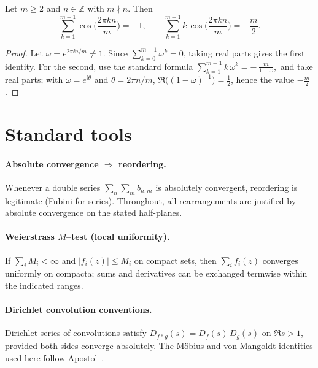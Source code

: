 \begin{lemma}\label{lem:trig-sums}
Let $m\ge2$ and $n\in\mathbb Z$ with $m\nmid n$. Then
\[
\sum_{k=1}^{m-1}\cos\!\Big(\frac{2\pi kn}{m}\Big)=-1,
\qquad
\sum_{k=1}^{m-1}k\,\cos\!\Big(\frac{2\pi kn}{m}\Big)=-\frac{m}{2}.
\]
\end{lemma}
\begin{proof}
Let $\omega=e^{2\pi \ii n/m}\neq 1$. Since $\sum_{k=0}^{m-1}\omega^k=0$, taking real parts gives the first identity. For the second, use the standard formula
\(
\sum_{k=1}^{m-1}k\,\omega^k=-\,\frac{m}{1-\omega},
\)
and take real parts; with $\omega=e^{\ii\theta}$ and $\theta=2\pi n/m$, $\Re\big((1-\omega)^{-1}\big)=\frac12$, hence the value $-\frac{m}{2}$. 
\end{proof}

\section{Standard tools}\label{app:standard-tools}

\paragraph{Absolute convergence $\Rightarrow$ reordering.}
Whenever a double series $\sum_{n}\sum_{m} b_{n,m}$ is absolutely convergent, reordering is legitimate (Fubini for series). Throughout, all rearrangements are justified by absolute convergence on the stated half-planes.

\paragraph{Weierstrass $M$–test (local uniformity).}
If $\sum_i M_i<\infty$ and $|f_i(z)|\le M_i$ on compact sets, then $\sum_i f_i(z)$ converges uniformly on compacta; sums and derivatives can be exchanged termwise within the indicated ranges.

\paragraph{Dirichlet convolution conventions.}
Dirichlet series of convolutions satisfy $D_{f*g}(s)=D_f(s)\,D_g(s)$ on $\Re s>1$, provided both sides converge absolutely. The Möbius and von Mangoldt identities used here follow Apostol~\cite[Ch.~2]{apostol1976}.

